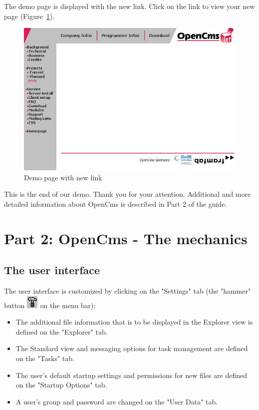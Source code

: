 The demo page is displayed with the new link. Click on the link to
view your new page (Figure~\ref{demopage03}).

\begin{figure}[hbt]
\begin{center}
\includegraphics[width=\sgw]
                   {pics/usermanual/demoPage03}
\caption[Demo page with new link]
           {Demo page with new link}
\label{demopage03}
\end{center}
\end{figure}

This is the end of our demo. Thank you for your attention. Additional and more detailed information about OpenCms is described in Part 2 of the guide.

\section{Part 2: OpenCms - The mechanics}

\subsection{The user interface}
The user interface is customized by clicking on the "Settings" tab
(the "hammer" button \includegraphics{pics/usermanual/ic_settings}
on the menu bar):

\begin{itemize}
\item The additional file information that is to be displayed in the Explorer view is defined on the "Explorer" tab.
\item The Standard view and messaging options for task management are defined on the "Tasks" tab.
\item The user's default startup settings and permissions for new files are defined on the "Startup Options" tab.
\item A user's group and password are changed on the "User Data" tab.
\end{itemize}

